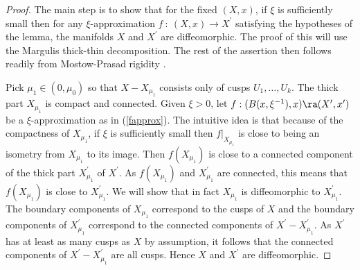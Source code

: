 \begin{proof}
The main step is to show that for the fixed $(X, x)$, if
$\xi$ is sufficiently small then for any $\xi$-approximation
$f \: : \: (X, x) \rightarrow X^\prime$ satisfying the hypotheses of the lemma,
the manifolds $X$ and $X^\prime$ are
diffeomorphic. The proof of this will use the
Margulis thick-thin decomposition. The rest of the assertion then
follows readily from Mostow-Prasad rigidity
\cite{Mostow,Prasad}.

Pick $\mu_1\in (0,\mu_0)$ so that $X -  X_{\mu_1}$
consists only of cusps $U_1,\ldots, U_k$. The thick part
$X_{\mu_1}$ is compact and connected. Given $\xi > 0$, let
$f:(B(x,\xi^{-1}),x)\ra (X',x')$ be a $\xi$-approximation
as in (\ref{fapprox}).
The intuitive idea is that because of the compactness
of $X_{\mu_1}$, if $\xi$ is sufficiently small then
$f \big|_{X_{\mu_1}}$ is close to being an isometry
from $X_{\mu_1}$ to its image.
Then $f(X_{\mu_1})$ is close to a connected component of
the thick part $X^\prime_{\mu_1}$ of $X^\prime$. As
$f(X_{\mu_1})$ and $X^\prime_{\mu_1}$ are connected,
this means that $f(X_{\mu_1})$ is close to $X^\prime_{\mu_1}$.
We will show that in fact $X_{\mu_1}$ is diffeomorphic to
$X^\prime_{\mu_1}$. The boundary components of
$X_{\mu_1}$ correspond to the cusps of $X$ and the
boundary components of
$X^\prime_{\mu_1}$ correspond to the connected components of
$X^\prime - X^\prime_{\mu_1}$. As $X^\prime$ has at least
as many cusps as $X$ by assumption, it follows that the
connected components of $X^\prime - X^\prime_{\mu_1}$ are
all cusps. Hence $X$ and
$X^\prime$ are diffeomorphic.


\end{proof}
